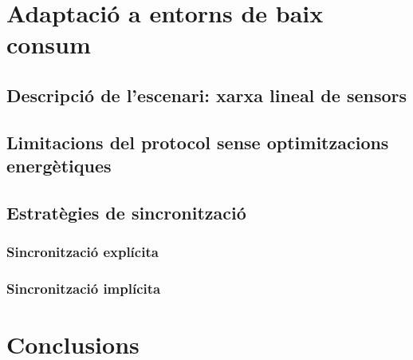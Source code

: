 \documentclass{tfgitic}[2024/07/01]
\begin{document}
{\chapter{Adaptació a entorns de baix consum}
\label{chap:adaptacio_baix_consum}
\section{Descripció de l’escenari: xarxa lineal de sensors}
\section{Limitacions del protocol sense optimitzacions energètiques}
\section{Estratègies de sincronització}
\subsection{Sincronització explícita}
\subsection{Sincronització implícita}

\chapter{Conclusions}

}
\end{document}
